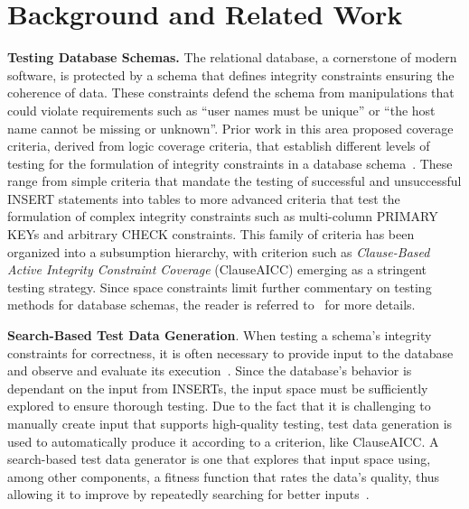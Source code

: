 
\section{Background and Related Work}




{\bf Testing Database Schemas.} The relational database, a cornerstone of modern software, is protected by a schema that
defines integrity constraints ensuring the coherence of data. These constraints defend the schema from manipulations
that could violate requirements such as ``user names must be unique'' or ``the host name cannot be missing or unknown''.
Prior work in this area proposed coverage criteria, derived from logic coverage criteria, that establish different
levels of testing for the formulation of integrity constraints in a database schema~\cite{mcminn2015}. These range from
simple criteria that mandate the testing of successful and unsuccessful INSERT statements into tables to more advanced
criteria that test the formulation of complex integrity constraints such as multi-column PRIMARY KEYs and arbitrary
CHECK constraints. This family of criteria has been organized into a subsumption hierarchy, with criterion such as {\em
Clause-Based Active Integrity Constraint Coverage} (ClauseAICC) emerging as a stringent testing strategy. Since space
constraints limit further commentary on testing methods for database schemas, the reader is referred
to~\cite{mcminn2015} for more details.


{\bf Search-Based Test Data Generation}. When testing a schema's integrity constraints for correctness, it is often
necessary to provide input to the database and observe and evaluate its execution~\cite{kapfhammer2013}.  Since the
database's behavior is dependant on the input from INSERTs, the input space must be sufficiently explored to ensure
thorough testing.  Due to the fact that it is challenging to manually create input that supports high-quality testing,
test data generation is used to automatically produce it according to a criterion, like ClauseAICC. A search-based test
data generator is one that explores that input space using, among other components, a fitness function that rates the
data's quality, thus allowing it to improve by repeatedly searching for better inputs~\cite{mcminn2004a}.

